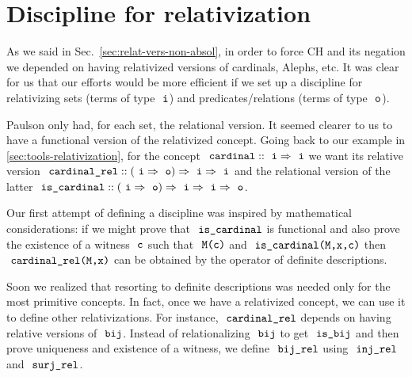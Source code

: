 \appendix

\section{Discipline for relativization}

As we said in Sec.~\ref{sec:relat-vers-non-absol}, in order to force
CH and its negation we depended on having relativized versions of
cardinals, Alephs, etc. It was clear for us that our efforts would be
more efficient if we set up a discipline for relativizing sets (terms
of type $\tyi$) and predicates/relations (terms of type $\tyo$).

Paulson only had, for each set, the relational version. It seemed
clearer to us to have a functional version of the relativized concept.
Going back to our example in \ref{sec:tools-relativization}, for the
concept $\isatt{cardinal}::\tyi \fun \tyi$ we want its relative
version
$\isatt{cardinal{\uscore}rel}::(\tyi \fun \tyo) \fun \tyi \fun\tyi$
and the relational version of the latter
$\isatt{is{\uscore}cardinal}::(\tyi \fun \tyo) \fun \tyi \fun \tyi
\fun \tyo$.

Our first attempt of defining a discipline was inspired by
mathematical considerations: if we might prove that
$\isatt{is{\uscore}cardinal}$ is functional and also prove the
existence of a witness $\isatt{c}$ such that $\isatt{M(c)}$ and
$\isatt{is{\uscore}cardinal(M,x,c)}$ then
$\isatt{cardinal{\uscore}rel(M,x)}$ can be obtained by the operator of
definite descriptions.

Soon we realized that resorting to definite descriptions was needed
only for the most primitive concepts. In fact, once we have a
relativized concept, we can use it to define other relativizations.
For instance, $\isatt{cardinal{\uscore}rel}$ depends on having
relative versions of $\isatt{bij}$. Instead of relationalizing
$\isatt{bij}$ to get $\isatt{is{\uscore}bij}$ and then prove
uniqueness and existence of a witness, we define
$\isatt{bij{\uscore}rel}$ using $\isatt{inj{\uscore}rel}$ and
$\isatt{surj{\uscore}rel}$.

